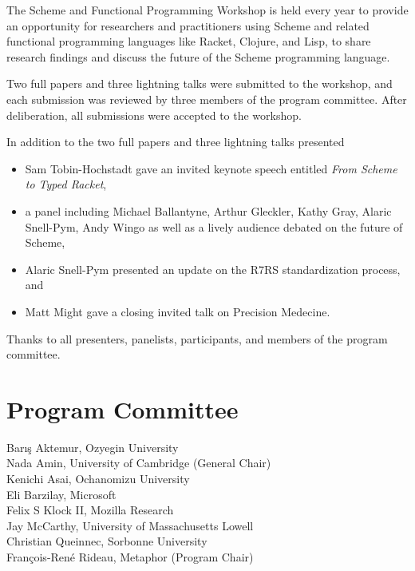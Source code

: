 \documentclass[oneside]{book}
\begin{document}
\vspace{5pt}
\noindent
The Scheme and Functional Programming Workshop is held every year to provide an
opportunity for researchers and practitioners using Scheme and related
functional programming languages like Racket, Clojure, and Lisp, to share
research findings and discuss the future of the Scheme programming language.

\vspace{5pt}
\noindent
Two full papers and three lightning talks were submitted to the workshop, and each submission was reviewed by
three members of the program committee.  After deliberation, all submissions
were accepted to the workshop.

\vspace{5pt}
\noindent
In addition to the two full papers and three lightning talks presented
\begin{itemize}
\item Sam Tobin-Hochstadt gave an invited keynote speech entitled \textit{From Scheme to Typed Racket},
\item a panel including Michael Ballantyne, Arthur Gleckler, Kathy Gray, Alaric Snell-Pym, Andy Wingo as well as a lively audience debated on the future of Scheme,
\item Alaric Snell-Pym presented an update on the R7RS standardization process, and
\item Matt Might gave a closing invited talk on Precision Medecine.
\end{itemize}

\vspace{5pt}
\noindent
Thanks to all presenters, panelists, participants, and members of the
program committee.

\section*{Program Committee}
\begin{multicols}{2}
\noindent
Barış Aktemur, Ozyegin University\\
Nada Amin, University of Cambridge (General Chair)\\
Kenichi Asai, Ochanomizu University\\
Eli Barzilay, Microsoft\\
Felix S Klock II, Mozilla Research\\
Jay McCarthy, University of Massachusetts Lowell\\
Christian Queinnec, Sorbonne University\\
François-René Rideau, Metaphor (Program Chair)\\
\end{multicols}
\end{document}
